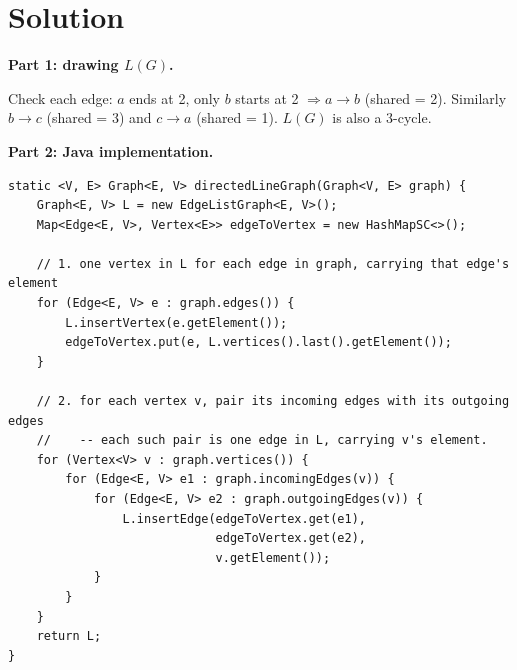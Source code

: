 \documentclass[11pt]{article}
\begin{document}
{\color{blue}
\section*{Solution}

\textbf{Part 1: drawing $L(G)$.}

\begin{center}
\qquad\qquad
{}
\end{center}

Check each edge: $a$ ends at 2, only $b$ starts at 2 $\Rightarrow a \to b$ (shared = 2). Similarly $b \to c$ (shared = 3) and $c \to a$ (shared = 1). $L(G)$ is also a 3-cycle.

\medskip

\textbf{Part 2: Java implementation.}

\begin{lstlisting}[basicstyle=\ttfamily\small\color{blue},
  keywordstyle=\bfseries\color{blue!70!black},
  commentstyle=\color{blue!50}]
static <V, E> Graph<E, V> directedLineGraph(Graph<V, E> graph) {
    Graph<E, V> L = new EdgeListGraph<E, V>();
    Map<Edge<E, V>, Vertex<E>> edgeToVertex = new HashMapSC<>();

    // 1. one vertex in L for each edge in graph, carrying that edge's element
    for (Edge<E, V> e : graph.edges()) {
        L.insertVertex(e.getElement());
        edgeToVertex.put(e, L.vertices().last().getElement());
    }

    // 2. for each vertex v, pair its incoming edges with its outgoing edges
    //    -- each such pair is one edge in L, carrying v's element.
    for (Vertex<V> v : graph.vertices()) {
        for (Edge<E, V> e1 : graph.incomingEdges(v)) {
            for (Edge<E, V> e2 : graph.outgoingEdges(v)) {
                L.insertEdge(edgeToVertex.get(e1),
                             edgeToVertex.get(e2),
                             v.getElement());
            }
        }
    }
    return L;
}
\end{lstlisting}

}
\end{document}
